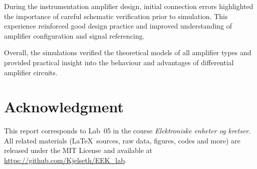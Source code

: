 \documentclass[conference]{IEEEtran}
\begin{document}
During the instrumentation amplifier design, initial connection errors highlighted the importance of careful schematic verification prior to simulation.  
This experience reinforced good design practice and improved understanding of amplifier configuration and signal referencing.  

\newpage

Overall, the simulations verified the theoretical models of all amplifier types and provided practical insight into the behaviour and advantages of differential amplifier circuits.



\section*{Acknowledgment}
This report corresponds to Lab~05 in the course \emph{Elektroniske enheter og kretser}.
All related materials (\LaTeX~sources, raw data, figures, codes and more) are released under the MIT License and available at \url{https://github.com/Kjelseth/EEK_lab}.
\end{document}
